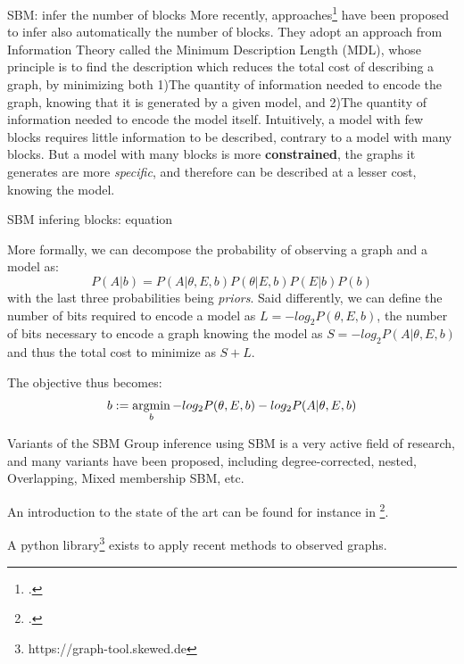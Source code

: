 \documentclass[a4paper,11pt]{book}
\begin{document}
\begin{textbox}{SBM: infer the number of blocks}
More recently, approaches\footcite{peixoto2019bayesian} have been proposed to infer also automatically the number of blocks. They adopt an approach from Information Theory called the Minimum Description Length (MDL), whose principle is to find the description which reduces the total cost of describing a graph, by minimizing both 1)The quantity of information needed to encode the graph, knowing that it is generated by a given model, and 2)The quantity of information needed to encode the model itself. Intuitively, a model with few blocks requires little information to be described, contrary to a model with many blocks. But a model with many blocks is more \textbf{constrained}, the graphs it generates are more \textit{specific}, and therefore can be described at a lesser cost, knowing the model.

\end{textbox}





\begin{textbox}{SBM infering blocks: equation}

More formally, we can decompose the probability of observing a graph and a model as:
\[
P(A|b)= P(A|\theta, E, b) P(\theta|E, b) P(E|b)P (b)
\]
with the last three probabilities being \textit{priors}.  Said differently, we can define the number of bits required to encode a model as $L = -log_2 P(\theta,E,b)$, the number of bits necessary to encode a graph knowing the model as $S = -log_2 P(A|\theta,E,b)$ and thus the total cost to minimize as $S+L$. 

The objective thus becomes:
\[
b:=\operatorname*{argmin}_{b} - log_2 P(\theta,E,b) - log_2 P(A|\theta,E,b)
\]

\end{textbox}


\begin{textbox}{Variants of the SBM}
Group inference using SBM is a very active field of research, and many variants have been proposed, including degree-corrected, nested, Overlapping, Mixed membership SBM, etc.

An introduction to the state of the art can be found for instance in \footcite{lee2019review}.

A python library\footnote{https://graph-tool.skewed.de} exists to apply recent methods to observed graphs.
\end{textbox}
\end{document}
